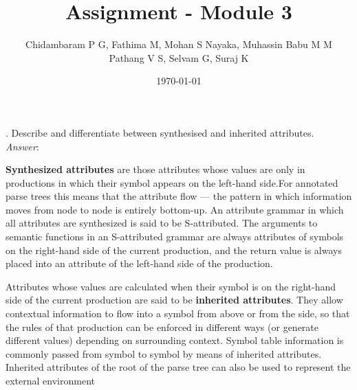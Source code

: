 \documentclass[a4paper,12pt]{article}
\begin{document}
\title{Assignment - Module 3}
\date{\today}
\author{Chidambaram P G, Fathima M, Mohan S Nayaka, Muhassin Babu M M\\ Pathang V S, Selvam G, Suraj K}
\maketitle
{}. Describe and differentiate between synthesised and inherited attributes.\\
\emph{Answer}:

\textbf{Synthesized attributes} are those attributes whose values are only in productions in which their symbol appears on the left-hand side.For annotated parse trees this means that the attribute flow --- the pattern in
which information moves from node to node is entirely bottom-up.    An attribute grammar in which all attributes are synthesized is said to be S-attributed. The arguments to semantic functions in an S-attributed grammar are always attributes of symbols on the right-hand side of the current production, and the return value is always placed into an attribute of the left-hand
side of the production.

Attributes whose values are calculated when their symbol is on the right-hand side of the current production are said to be \textbf{inherited attributes}. They allow contextual information to flow into a symbol from above or from the side, so that the rules of that production can be enforced in different ways (or generate different values) depending on surrounding context. Symbol table information is commonly passed
from symbol to symbol by means of inherited attributes. Inherited attributes of
the root of the parse tree can also be used to represent the external environment
\end{document}
